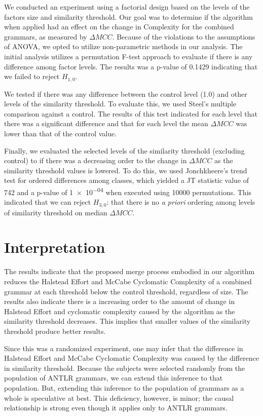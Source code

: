 \documentclass[conference]{IEEEtran}
\begin{document}
We conducted an experiment using a factorial design based on the levels
of the factors size and similarity threshold. Our goal was to determine
if the algorithm when applied had an effect on the change in Complexity
for the combined grammars, as measured by \(\Delta MCC\). Because of the
violations to the assumptions of ANOVA, we opted to utilize
non-parametric methods in our analysis. The initial analysis utilizes a
permutation F-test approach to evaluate if there is any difference among
factor levels. The results was a p-value of 0.1429 indicating that we
failed to reject \(H_{1,0}\).

We tested if there was any difference between the control level (1.0)
and other levels of the similarity threshold. To evaluate this, we used
Steel's multiple comparison against a control. The results of this test
indicated for each level that there was a significant difference and
that for each level the mean \(\Delta MCC\) was lower than that of the
control value.

Finally, we evaluated the selected levels of the similarity threshold
(excluding control) to if there was a decreasing order to the change in
\(\Delta MCC\) as the similarity threshold values is lowered. To do
this, we used Jonchkheere's trend test for ordered differences among
classes, which yielded a JT statistic value of 742 and a p-value of
\num{1e-04} when executed using 10000 permutations. This indicated that
we can reject \(H_{3,0}\): that there is no \emph{a priori} ordering
among levels of similarity threshold on median \(\Delta MCC\).

\hypertarget{sec:discussion}{%
\section{Interpretation}\label{sec:discussion}}

The results indicate that the proposed merge process embodied in our
algorithm reduces the Halstead Effort and McCabe Cyclomatic Complexity
of a combined grammar at each threshold below the control threshold,
regardless of size. The results also indicate there is a increasing
order to the amount of change in Halstead Effort and cyclomatic
complexity caused by the algorithm as the similarity threshold
decreases. This implies that smaller values of the similarity threshold
produce better results.

Since this was a randomized experiment, one may infer that the
difference in Halstead Effort and McCabe Cyclomatic Complexity was
caused by the difference in similarity threshold. Because the subjects
were selected randomly from the population of ANTLR grammars, we can
extend this inference to that population. But, extending this inference
to the population of grammars as a whole is speculative at best. This
deficiency, however, is minor; the causal relationship is strong even
though it applies only to ANTLR grammars.
\end{document}

